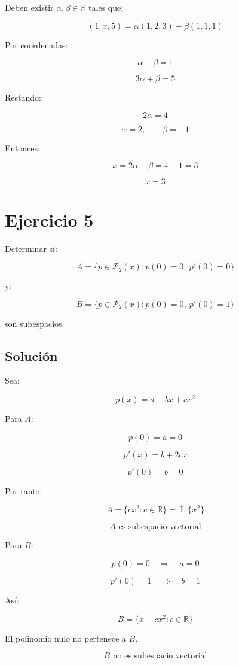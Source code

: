 \documentclass[11pt,a4paper]{article}
\newcommand{\R}{\mathbb{R}}
\newcommand{\Pn}{\mathcal{P}}
\newcommand{\Span}{\operatorname{L}}
\begin{document}
	Deben existir $\alpha,\beta\in\R$ tales que:

	\[
	(1,x,5)
	=
	\alpha(1,2,3)
	+
	\beta(1,1,1)
	\]

	Por coordenadas:

	\[
	\alpha+\beta=1
	\]

	\[
	3\alpha+\beta=5
	\]

	Restando:

	\[
	2\alpha=4
	\]

	\[
	\alpha=2,
	\qquad
	\beta=-1
	\]

	Entonces:

	\[
	x=2\alpha+\beta
	=
	4-1
	=
	3
	\]

	\[
	\boxed{x=3}
	\]

\section{Ejercicio 5}
	Determinar si:

	\[
	A=
	\{p\in\Pn_2(x):p(0)=0,\ p'(0)=0\}
	\]

	y:

	\[
	B=
	\{p\in\Pn_2(x):p(0)=0,\ p'(0)=1\}
	\]

	son subespacios.

	\subsection{Solución}

	Sea:

	\[
	p(x)=a+bx+cx^2
	\]

	Para $A$:

	\[
	p(0)=a=0
	\]

	\[
	p'(x)=b+2cx
	\]

	\[
	p'(0)=b=0
	\]

	Por tanto:

	\[
	A=
	\{cx^2:c\in\R\}
	=
	\Span\{x^2\}
	\]

	\[
	\boxed{
	A\text{ es subespacio vectorial}
	}
	\]

	Para $B$:

	\[
	p(0)=0
	\quad\Longrightarrow\quad
	a=0
	\]

	\[
	p'(0)=1
	\quad\Longrightarrow\quad
	b=1
	\]

	Así:

	\[
	B=
	\{x+cx^2:c\in\R\}
	\]

	El polinomio nulo no pertenece a $B$.

	\[
	\boxed{
	B\text{ no es subespacio vectorial}
	}
	\]
\end{document}

